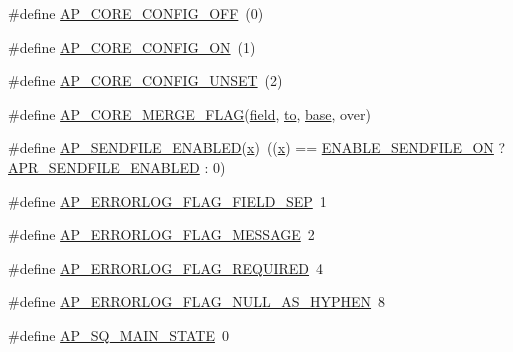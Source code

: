 \begin{DoxyCompactItemize}
\item 
\#define \hyperlink{group__APACHE__CORE__HTTPD_gab69446446d9659ab4f3390b5b4e99fe1}{A\+P\+\_\+\+C\+O\+R\+E\+\_\+\+C\+O\+N\+F\+I\+G\+\_\+\+O\+FF}~(0)
\item 
\#define \hyperlink{group__APACHE__CORE__HTTPD_gae863060c01667ff8420677db36f38ed1}{A\+P\+\_\+\+C\+O\+R\+E\+\_\+\+C\+O\+N\+F\+I\+G\+\_\+\+ON}~(1)
\item 
\#define \hyperlink{group__APACHE__CORE__HTTPD_ga6e5e0b618d74592d06257c8cac13c3e0}{A\+P\+\_\+\+C\+O\+R\+E\+\_\+\+C\+O\+N\+F\+I\+G\+\_\+\+U\+N\+S\+ET}~(2)
\item 
\#define \hyperlink{group__APACHE__CORE__HTTPD_ga67354b992b23c3d71e5993262187eef9}{A\+P\+\_\+\+C\+O\+R\+E\+\_\+\+M\+E\+R\+G\+E\+\_\+\+F\+L\+AG}(\hyperlink{group__APACHE__CORE__DAEMON_gae5c4b068a26ad890b3f11ac8dc993347}{field},  \hyperlink{pcretest_8txt_aa22c98f630e4b3fe86ee17ce5150c62f}{to},  \hyperlink{group__apr__tables_ga74964146831939c658b798439fc32f6d}{base},  over)
\item 
\#define \hyperlink{group__APACHE__CORE__HTTPD_ga0c94f7dbde53f7b4b732139396f4d7c1}{A\+P\+\_\+\+S\+E\+N\+D\+F\+I\+L\+E\+\_\+\+E\+N\+A\+B\+L\+ED}(\hyperlink{pcregrep_8txt_a4242e9148f20c002763bf4ba53b26ad6}{x})~((\hyperlink{pcregrep_8txt_a4242e9148f20c002763bf4ba53b26ad6}{x}) == \hyperlink{http__core_8h_a1617fa28357361e285162aa31edcf419}{E\+N\+A\+B\+L\+E\+\_\+\+S\+E\+N\+D\+F\+I\+L\+E\+\_\+\+ON} ? \hyperlink{group__apr__file__open__flags_ga17e216aadb23254580258889e10c53f3}{A\+P\+R\+\_\+\+S\+E\+N\+D\+F\+I\+L\+E\+\_\+\+E\+N\+A\+B\+L\+ED} \+: 0)
\item 
\#define \hyperlink{group__APACHE__CORE__HTTPD_ga88ce73c161cc5b055ce1d222b5f2cb68}{A\+P\+\_\+\+E\+R\+R\+O\+R\+L\+O\+G\+\_\+\+F\+L\+A\+G\+\_\+\+F\+I\+E\+L\+D\+\_\+\+S\+EP}~1
\item 
\#define \hyperlink{group__APACHE__CORE__HTTPD_ga1c9a8bb1ea7b44bef6ed0a30e57d2d0d}{A\+P\+\_\+\+E\+R\+R\+O\+R\+L\+O\+G\+\_\+\+F\+L\+A\+G\+\_\+\+M\+E\+S\+S\+A\+GE}~2
\item 
\#define \hyperlink{group__APACHE__CORE__HTTPD_gae922eee134fb1d73da3522a58d8e4e1b}{A\+P\+\_\+\+E\+R\+R\+O\+R\+L\+O\+G\+\_\+\+F\+L\+A\+G\+\_\+\+R\+E\+Q\+U\+I\+R\+ED}~4
\item 
\#define \hyperlink{group__APACHE__CORE__HTTPD_ga34356c24c792d89210a78db888a3c86a}{A\+P\+\_\+\+E\+R\+R\+O\+R\+L\+O\+G\+\_\+\+F\+L\+A\+G\+\_\+\+N\+U\+L\+L\+\_\+\+A\+S\+\_\+\+H\+Y\+P\+H\+EN}~8
\item 
\#define \hyperlink{group__APACHE__CORE__HTTPD_ga5e12d4f825b573eb4c51c6676ecf0808}{A\+P\+\_\+\+S\+Q\+\_\+\+M\+A\+I\+N\+\_\+\+S\+T\+A\+TE}~0

\end{DoxyCompactItemize}
